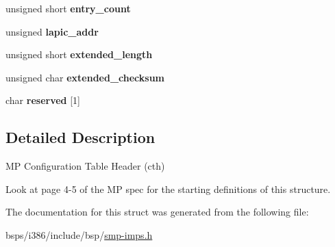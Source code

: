 \begin{DoxyCompactItemize}
unsigned short {\bfseries entry\+\_\+count}
\item 
\mbox{\label{structimps__cth_aac2c7a7dcbb5083fa8e8990c1208c6a7}} 
unsigned {\bfseries lapic\+\_\+addr}
\item 
\mbox{\label{structimps__cth_aedde84dec7b2ac9e41d6bfec850824f3}} 
unsigned short {\bfseries extended\+\_\+length}
\item 
\mbox{\label{structimps__cth_af8b254fbc13f630762a6e11c652ab9a8}} 
unsigned char {\bfseries extended\+\_\+checksum}
\item 
\mbox{\label{structimps__cth_a47eec869ba68e85ea7f4eb178fbd8116}} 
char {\bfseries reserved} \mbox{[}1\mbox{]}
\end{DoxyCompactItemize}


\subsection{Detailed Description}
MP Configuration Table Header (cth) 

Look at page 4-\/5 of the MP spec for the starting definitions of this structure. 

The documentation for this struct was generated from the following file\+:\begin{DoxyCompactItemize}
\item 
bsps/i386/include/bsp/\mbox{\hyperlink{smp-imps_8h}{smp-\/imps.\+h}}\end{DoxyCompactItemize}
